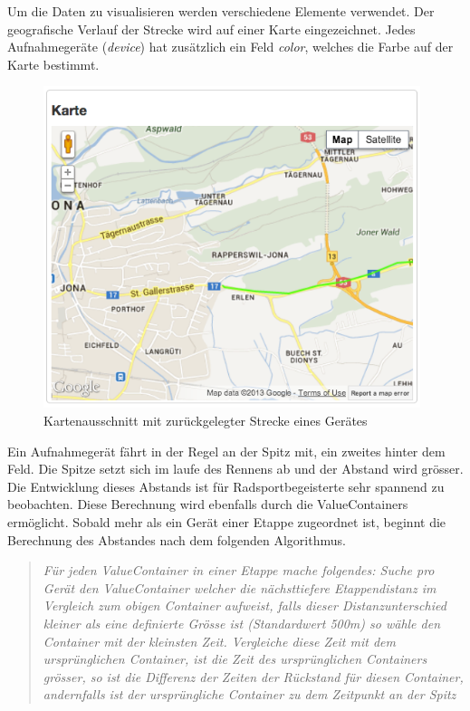 Um die Daten zu visualisieren werden verschiedene Elemente verwendet. Der geografische Verlauf der Strecke wird auf einer Karte eingezeichnet. Jedes Aufnahmegeräte (\textit{device}) hat zusätzlich ein Feld \textit{color}, welches die Farbe auf der Karte bestimmt.
\begin{figure}[H]
	\centering
	\includegraphics[width=110mm]{images/tourliveweb/karte_neu.png}
	\caption{Kartenausschnitt mit zurückgelegter Strecke eines Gerätes}
\end{figure}

Ein Aufnahmegerät fährt in der Regel an der Spitz mit, ein zweites hinter dem Feld. Die Spitze setzt sich im laufe des Rennens ab und der Abstand wird grösser. Die Entwicklung dieses Abstands ist für Radsportbegeisterte sehr spannend zu beobachten. Diese Berechnung wird ebenfalls durch die ValueContainers ermöglicht. Sobald mehr als ein Gerät einer Etappe zugeordnet ist, beginnt die Berechnung des Abstandes nach dem folgenden Algorithmus.
\begin{quotation}
\textit{Für jeden ValueContainer in einer Etappe mache folgendes:
Suche pro Gerät den ValueContainer welcher die nächsttiefere Etappendistanz im Vergleich zum obigen Container aufweist, falls dieser Distanzunterschied kleiner als eine definierte Grösse ist (Standardwert 500m) so wähle den Container mit der kleinsten Zeit. Vergleiche diese Zeit mit dem ursprünglichen Container, ist die Zeit des ursprünglichen Containers grösser, so ist die Differenz der Zeiten der Rückstand für diesen Container, andernfalls ist der ursprüngliche Container zu dem Zeitpunkt an der Spitz}
\end{quotation}

